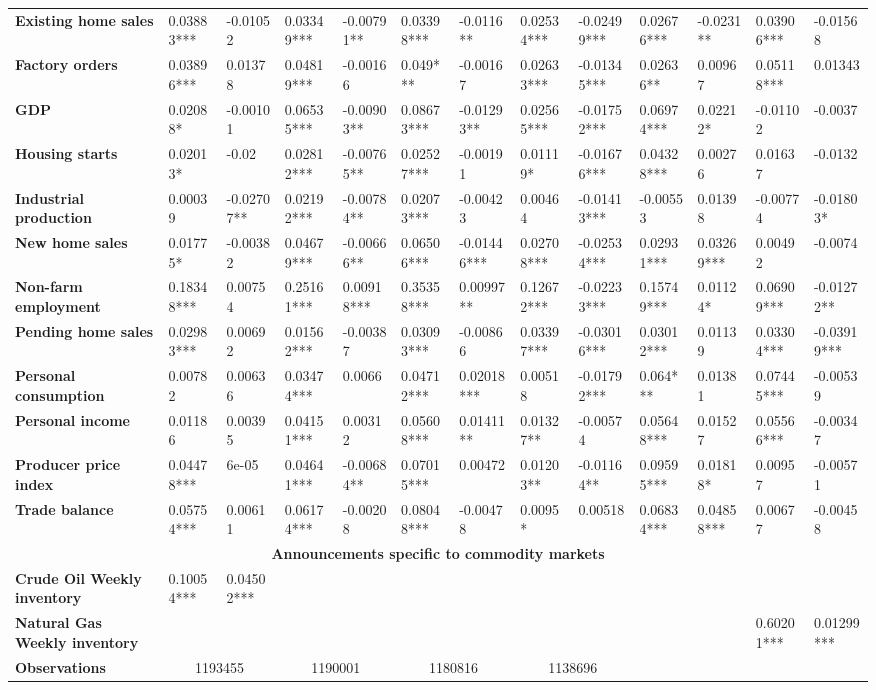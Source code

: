 \begin{sidewaystable}
{\begin{tabular}{@{}lllllllllllll@{}}
\textbf{Existing home sales}& 0.03883*** & -0.01052 & 0.03349*** & -0.00791** & 0.03398*** & -0.0116** & 0.02534*** & -0.02499*** & 0.02676*** & -0.0231** & 0.03906*** & -0.01568 \\ \textbf{Factory orders}& 0.03896*** & 0.01378 & 0.04819*** & -0.00166 & 0.049*** & -0.00167 & 0.02633*** & -0.01345*** & 0.02636** & 0.00967 & 0.05118*** & 0.01343 \\ \textbf{GDP}& 0.02088* & -0.00101 & 0.06535*** & -0.00903** & 0.08673*** & -0.01293** & 0.02565*** & -0.01752*** & 0.06974*** & 0.02212* & -0.01102 & -0.0037 \\ \textbf{Housing starts}& 0.02013* & -0.02 & 0.02812*** & -0.00765** & 0.02527*** & -0.00191 & 0.01119* & -0.01676*** & 0.04328*** & 0.00276 & 0.01637 & -0.0132 \\ \textbf{Industrial production}& 0.00039 & -0.02707** & 0.02192*** & -0.00784** & 0.02073*** & -0.00423 & 0.00464 & -0.01413*** & -0.00553 & 0.01398 & -0.00774 & -0.01803* \\ \textbf{New home sales}& 0.01775* & -0.00382 & 0.04679*** & -0.00666** & 0.06506*** & -0.01446*** & 0.02708*** & -0.02534*** & 0.02931*** & 0.03269*** & 0.00492 & -0.0074 \\ \textbf{Non-farm employment}& 0.18348*** & 0.00754 & 0.25161*** & 0.00918*** & 0.35358*** & 0.00997** & 0.12672*** & -0.02233*** & 0.15749*** & 0.01124* & 0.06909*** & -0.01272** \\ \textbf{Pending home sales}& 0.02983*** & 0.00692 & 0.01562*** & -0.00387 & 0.03093*** & -0.00866 & 0.03397*** & -0.03016*** & 0.03012*** & 0.01139 & 0.03304*** & -0.03919*** \\ \textbf{Personal consumption}& 0.00782 & 0.00636 & 0.03474*** & 0.0066 & 0.04712*** & 0.02018*** & 0.00518 & -0.01792*** & 0.064*** & 0.01381 & 0.07445*** & -0.00539 \\ \textbf{Personal income}& 0.01186 & 0.00395 & 0.04151*** & 0.00312 & 0.05608*** & 0.01411** & 0.01327** & -0.00574 & 0.05648*** & 0.01527 & 0.05566*** & -0.00347 \\ \textbf{Producer price index}& 0.04478*** & 6e-05 & 0.04641*** & -0.00684** & 0.07015*** & 0.00472 & 0.01203** & -0.01164** & 0.09595*** & 0.01818* & 0.00957 & -0.00571 \\ \textbf{Trade balance}& 0.05754*** & 0.00611 & 0.06174*** & -0.00208 & 0.08048*** & -0.00478 & 0.0095* & 0.00518 & 0.06834*** & 0.04858*** & 0.00677 & -0.00458 \\  \midrule \multicolumn{13}{c}{\textbf{Announcements specific to commodity markets}} \\ \midrule \textbf{Crude Oil Weekly inventory}& 0.10054*** & 0.04502*** &  &  &  &  &  &  &  &  &  &  \\ \textbf{Natural Gas Weekly inventory}&  &  &  &  &  &  &  &  &  &  & 0.60201*** & 0.01299*** \\  \midrule \textbf{Observations}             &\multicolumn{2}{c}{ 1193455 }                                                 & \multicolumn{2}{c}{ 1190001 }                                                 & \multicolumn{2}{c}{ 1180816 }                                                 & \multicolumn{2}{c}{ 1138696 }                  
\end{tabular}}
\end{sidewaystable}
